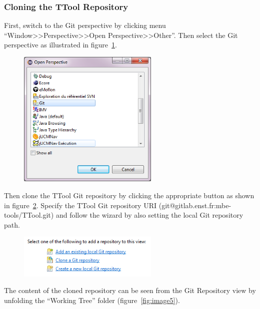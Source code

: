 \documentclass[12pt]{article}
\begin{document}
\subsubsection{Cloning the TTool Repository}

First, switch to the Git perspective by clicking menu
``Window>>Perspective>>Open Perspective>>Other''. Then select the Git
perspective as illustrated in figure~\ref{fig:image3}.

\begin{figure}[H]
\begin{center}
\includegraphics[width=0.6\textwidth]{images/image3.png}
\end{center}
\caption{}
\label{fig:image3}
\end{figure}

Then clone the TTool Git repository by clicking the appropriate button as shown
in figure~\ref{fig:image4}. Specify the TTool Git repository URI
(git@gitlab.enst.fr:mbe-tools/TTool.git) and follow the wizard by also setting
the local Git repository path.

\begin{figure}[H]
\begin{center}
\includegraphics[width=0.6\textwidth]{images/image4.png}
\end{center}
\caption{}
\label{fig:image4}
\end{figure}

The content of the cloned repository can be seen from the Git Repository view by
unfolding the ``Working Tree'' folder (figure~\ref{fig:image5}).
\end{document}
